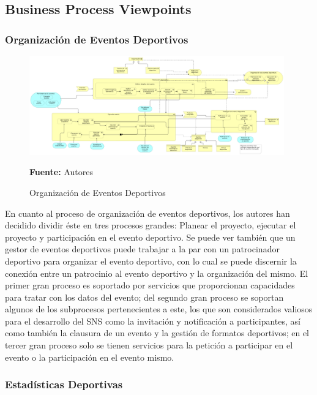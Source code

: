 \subsection{Business Process Viewpoints}

\subsubsection{Organización de Eventos Deportivos}

\begin{figure}[!htb]
  \begin{center}
    \includegraphics[width=11cm]{./imagenes/Archimate/vistas/business_process/organizacioneventosdeportivos.png}
    \caption{Organización de Eventos Deportivos}
    \label{fig:bp_organizacion_eventos_deportivos}
    \textbf{Fuente:}  Autores
  \end{center}
\end{figure}

En cuanto al proceso de organización de eventos deportivos, los autores han decidido dividir éste en tres procesos grandes: Planear el proyecto, ejecutar el proyecto y participación en el evento deportivo. Se puede ver también que un gestor de eventos deportivos puede trabajar a la par con un patrocinador deportivo para organizar el evento deportivo, con lo cual se puede discernir la conexión entre un patrocinio al evento deportivo y la organización del mismo. El primer gran proceso es soportado por servicios que proporcionan capacidades para tratar con los datos del evento; del segundo gran proceso se soportan algunos de los subprocesos pertenecientes a este, los que son considerados valiosos para el desarrollo del SNS como la invitación y notificación a participantes, así como también la clausura de un evento y la gestión de formatos deportivos; en el tercer gran proceso solo se tienen servicios para la petición a participar en el evento o la participación en el evento mismo.

\subsubsection{Estadísticas Deportivas}

